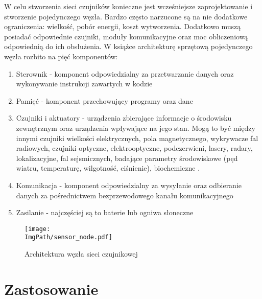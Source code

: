 W celu stworzenia sieci czujników konieczne jest wcześniejsze zaprojektowanie i stworzenie pojedynczego węzła. Bardzo często narzucone są na nie dodatkowe ograniczenia: wielkość, pobór energii, koszt wytworzenia. Dodatkowo muszą posiadać odpowiednie czujniki, moduły komunikacyjne oraz moc obliczeniową odpowiednią do ich obsłużenia. W książce \cite{Karl2006} architekturę sprzętową pojedynczego węzła rozbito na pięć komponentów:
\begin{enumerate}
	\item Sterownik - komponent odpowiedzialny za przetwarzanie danych oraz wykonywanie instrukcji zawartych w kodzie
	\item Pamięć - komponent przechowujący programy oraz dane
	\item Czujniki i aktuatory - urządzenia zbierające informacje o środowisku zewnętrznym oraz urządzenia wpływające na jego stan. Mogą to być między innymi czujniki wielkości elektrycznych, pola magnetycznego, wykrywacze fal radiowych, czujniki optyczne, elektrooptyczne, podczerwieni, lasery, radary, lokalizacyjne, fal sejsmicznych, badające parametry środowiskowe (pęd wiatru, temperaturę, wilgotność, ciśnienie), biochemiczne \cite{Sohraby2006}.
	\item Komunikacja - komponent odpowiedzialny za wysyłanie oraz odbieranie danych za pośrednictwem bezprzewodowego kanału komunikacyjnego
	\item Zasilanie - najczęściej są to baterie lub ogniwa słoneczne
\end{enumerate}

\begin{figure}[H]
	\begin{center}
		\texttt{[image: \\ImgPath/sensor\_node.pdf]}
	\end{center}
	\caption{Architektura węzła sieci czujnikowej}
\end{figure}

\section{Zastosowanie}
